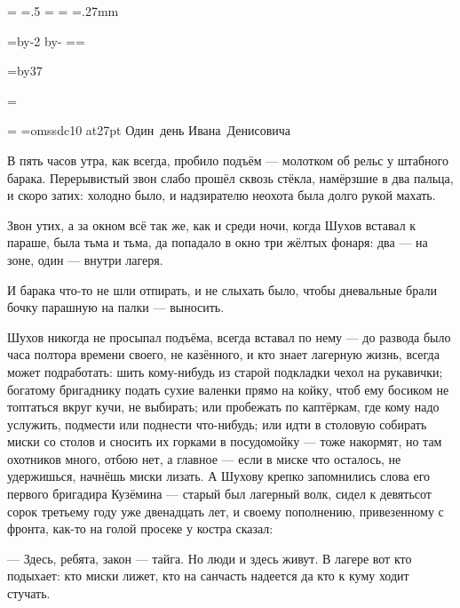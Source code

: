 \pdfpagewidth=297mm
\pdfpageheight=210mm
\pdfhorigin=1in
\pdfvorigin=0pt

\shhtotal=\pdfpagewidth
\htotal=.5\shhtotal
\vtotal=\pdfpageheight
\shoutline=0pt
\shstaplewidth=0pt
\shcrop=0pt
\shfootline={}
\shthickness=.27mm

\horigin=9mm
\hsize=\htotal \advance\hsize by-2\horigin
\advance\hsize by-\QUIRE
\output={\ifodd\pageno\else\hoffset=\QUIRE\fi \plainoutput}

\vorigin=3.8mm
\vsize=\topskip \advance\vsize by37\baselineskip

\footline={\line{\hss\tenrm\folio\hss}}

 

\bgroup
\footline={\hfil}
\font\T=omssdc10 at27pt
\topglue 5cm
\hbox{\T Один день}
\kern20pt
\hbox{\T Ивана Денисовича}
\vfil\eject
\egroup
\def\folio{{\advance\pageno by-1 \number\pageno}}

В пять часов утра, как всегда, пробило подъём --- молотком об рельс у штабного барака.
Перерывистый звон слабо прошёл сквозь стёкла, намёрзшие в два пальца, и скоро затих: холодно
было, и надзирателю неохота была долго рукой махать.

Звон утих, а за окном всё так же, как и среди ночи, когда Шухов вставал к параше, была тьма и
тьма, да попадало в окно три жёлтых фонаря: два --- на зоне, один --- внутри лагеря.

И барака что-то не шли отпирать, и не слыхать было, чтобы дневальные брали бочку парашную на
палки --- выносить.

Шухов никогда не просыпал подъёма, всегда вставал по нему --- до развода было часа полтора
времени своего, не казённого, и кто знает лагерную жизнь, всегда может подработать: шить
кому-нибудь из старой подкладки чехол на рукавички; богатому бригаднику подать сухие
валенки прямо на койку, чтоб ему босиком не топтаться вкруг кучи, не выбирать; или пробежать
по каптёркам, где кому надо услужить, подмести или поднести что-нибудь; или идти в столовую
собирать миски со столов и сносить их горками в посудомойку --- тоже накормят, но там
охотников много, отбою нет, а главное --- если в миске что осталось, не удержишься, начнёшь
миски лизать. А Шухову крепко запомнились слова его первого бригадира Кузёмина --- старый был
лагерный волк, сидел к девятьсот сорок третьему году уже двенадцать лет, и своему
пополнению, привезенному с фронта, как-то на голой просеке у костра сказал:

--- Здесь, ребята, закон --- тайга. Но люди и здесь живут. В лагере вот кто подыхает: кто миски
лижет, кто на санчасть надеется да кто к куму ходит стучать.


